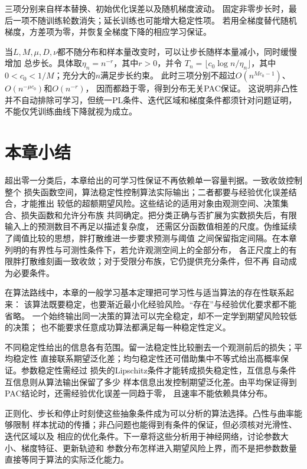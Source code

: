 三项分别来自样本替换、初始优化误差以及随机梯度波动。
固定非零步长时，最后一项不随训练轮数消失；延长训练也可能增大稳定性项。
若用全梯度替代随机梯度，方差项为零，并恢复全梯度下降的相应学习保证。

当$L,M,\mu,D,\nu$都不随分布和样本量改变时，可以让步长随样本量减小，同时缓慢增加
总步长。具体取$\eta_n=n^{-r}$，其中$r>0$，并令
$T_n=\lfloor c_0\log n/\eta_n\rfloor$，其中$0<c_0<1/M$；充分大的$n$满足步长约束。
此时三项分别不超过$O(n^{Mc_0-1})$、$O(n^{-\mu c_0})$和$O(n^{-r})$，
因而都趋于零，得到分布无关PAC保证。
这说明非凸性并不自动排除可学习，但统一PL条件、迭代区域和梯度条件都须针对问题证明，
不能仅凭训练曲线下降就视为成立。

\section{本章小结}
\label{sec:general-learning-summary}

超出零一分类后，本章给出的可学习性保证不再依赖单一容量判据。一致收敛控制整个
损失函数空间，算法稳定性控制算法实际输出；二者都要与经验优化误差结合，才能推出
较低的超额期望风险。这些结论的适用对象由观测空间、决策集合、损失函数和允许分布族
共同确定。把分类正确与否扩展为实数损失后，有限输入上的预测数目不再足以描述复杂度，
还需区分函数值相差的尺度。伪维延续了阈值比较的思想，胖打散维进一步要求预测与阈值
之间保留指定间隔。在本章列明的有界性与可测性条件下，若允许观测空间上的全部分布，
各正尺度上的有限胖打散维刻画一致收敛；对于受限分布族，它仍提供充分条件，但不再
自动成为必要条件。

在算法路线中，本章的一般学习基本定理把可学习性与适当算法的存在性联系起来：
该算法既要稳定，也要渐近最小化经验风险。“存在”与经验优化要求都不能省略。
一个始终输出同一决策的算法可以完全稳定，却不一定学到期望风险较低的决策；
也不能要求任意成功算法都满足每一种稳定性定义。

不同稳定性给出的信息各有范围。留一法稳定性比较删去一个观测前后的损失；平均稳定性
直接联系期望泛化差；均匀稳定性还可借助集中不等式给出高概率保证。参数稳定性需经过
损失的Lipschitz条件才能转成损失稳定性，互信息与条件互信息则从算法输出保留了多少
样本信息出发控制期望泛化差。由平均保证得到PAC结论时，还需经验优化误差一同趋于零，
且速率不能依赖具体分布。

正则化、步长和停止时刻使这些抽象条件成为可以分析的算法选择。凸性与曲率能够限制
样本扰动的传播；非凸问题也能得到有条件的保证，但必须核对光滑性、迭代区域以及
相应的优化条件。下一章将这些分析用于神经网络，讨论参数大小、梯度特征、更新轨迹和
参数分布怎样进入期望风险上界，而不是把参数数量直接等同于算法的实际泛化能力。


